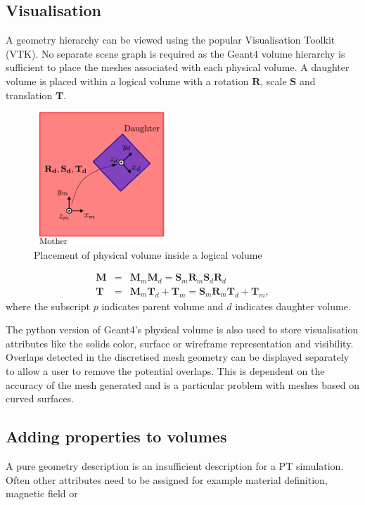 \documentclass[final,5p,times,twocolumn]{elsarticle}
\begin{document}
\subsection{Visualisation}
A  geometry hierarchy can be viewed using the popular Visualisation Toolkit (VTK). No separate scene graph is required as the Geant4 volume hierarchy is sufficient 
to place the meshes associated with each physical volume. A daughter volume is placed within a logical volume with a rotation $\mathbf{R}$, scale $\mathbf{S}$ and 
translation $\mathbf{T}$.

\begin{figure}[htbp]
\begin{center}
\includegraphics[width=5cm]{./diagrams/lvToPv.pdf}
\caption{Placement of physical volume inside a logical volume}
\label{fig:lvToPv}
\end{center}
\end{figure} 

\begin{eqnarray}
\mathbf{M}	  	& = & \mathbf{M}_m \mathbf{M}_d  = \mathbf{S}_m \mathbf{R}_m  \mathbf{S}_d \mathbf{R}_d\\
\mathbf{T}	 		& = & \mathbf{M}_m \mathbf{T}_d + \mathbf{T}_m= \mathbf{S}_m \mathbf{R}_m \mathbf{T}_d + \mathbf{T}_m,
\end{eqnarray}
where the subscript $p$ indicates parent volume and $d$ indicates daughter volume.

The python version of Geant4's physical volume is also used to store visualisation attributes like the solids 
color, surface or wireframe representation and visibility. Overlaps detected in the discretised mesh geometry can be displayed separately to allow a user to remove
the potential overlaps. This is dependent on the accuracy of the mesh generated and is a particular problem with meshes based on curved surfaces.    

\subsection{Adding properties to volumes}
A pure geometry description is an insufficient description for a PT simulation. Often other attributes need to be assigned for example material definition, magnetic field or    
\end{document}
